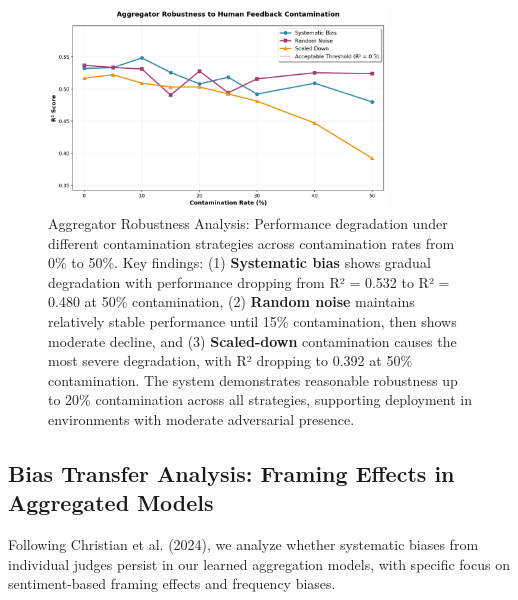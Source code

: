 \begin{figure}[htbp]
    \centering
    \includegraphics[width=0.8\textwidth]{experiments/1b_persona_poisoning/results/aggregator_robustness_analysis.png}
    \caption{Aggregator Robustness Analysis: Performance degradation under different contamination strategies across contamination rates from 0\% to 50\%. Key findings: (1) \textbf{Systematic bias} shows gradual degradation with performance dropping from R² = 0.532 to R² = 0.480 at 50\% contamination, (2) \textbf{Random noise} maintains relatively stable performance until 15\% contamination, then shows moderate decline, and (3) \textbf{Scaled-down} contamination causes the most severe degradation, with R² dropping to 0.392 at 50\% contamination. The system demonstrates reasonable robustness up to 20\% contamination across all strategies, supporting deployment in environments with moderate adversarial presence.}
    \label{fig:robustness_analysis}
\end{figure}

\subsection{Bias Transfer Analysis: Framing Effects in Aggregated Models}

Following Christian et al. (2024), we analyze whether systematic biases from individual judges persist in our learned aggregation models, with specific focus on sentiment-based framing effects and frequency biases.

